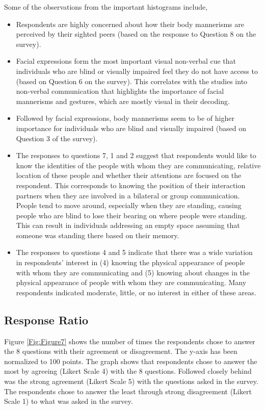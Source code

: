 \documentclass[oneside,11pt]{memoir}
\begin{document}
Some of the observations from the important histograms include,
\begin{itemize}
\item Respondents are highly concerned about how their body mannerisms are perceived by their sighted peers (based on the response to Question 8 on the survey).
\item Facial expressions form the most important visual non-verbal cue that individuals who are blind or visually impaired feel they do not have access to (based on Question 6 on the survey). This correlates with the studies into non-verbal communication that highlights the importance of facial mannerisms and gestures, which are mostly visual in their decoding.
\item Followed by facial expressions, body mannerisms seem to be of higher importance for individuals who are blind and visually impaired (based on Question 3 of the survey).
\item The responses to questions 7, 1 and 2 suggest that respondents would like to know the identities of the people with whom they are communicating, relative location of these people and whether their attentions are focused on the respondent. This corresponds to knowing the position of their interaction partners when they are involved in a bilateral or group communication. People tend to move around, especially when they are standing, causing people who are blind to lose their bearing on where people were standing. This can result in individuals addressing an empty space assuming that someone was standing there based on their memory.
\item The responses to questions 4 and 5 indicate that there was a wide variation in respondents' interest in (4) knowing the physical appearance of people with whom they are communicating and (5) knowing about changes in the physical appearance of people with whom they are communicating. Many respondents indicated moderate, little, or no interest in either of these areas.
\end{itemize}

\subsection{Response Ratio}
Figure \ref{Fig:Figure7} shows the number of times the respondents chose to answer the 8 questions with their agreement or disagreement. The y-axis has been normalized to 100 points. The graph shows that respondents chose to answer the most by agreeing (Likert Scale 4) with the 8 questions. Followed closely behind was the strong agreement (Likert Scale 5) with the questions asked in the survey. The respondents chose to answer the least through strong disagreement (Likert Scale 1) to what was asked in the survey.
\end{document}
